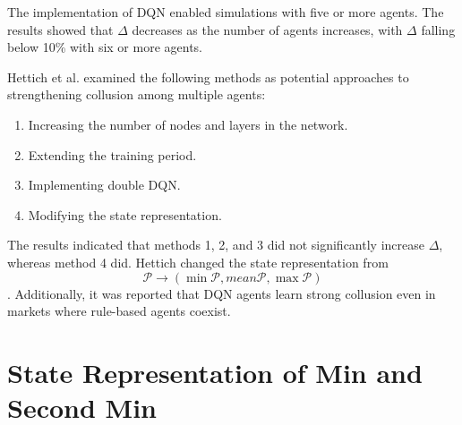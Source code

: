 \documentclass[runningheads]{llncs}
\begin{document}
        The implementation of DQN enabled simulations with five or more agents.
        The results showed that $\Delta$ decreases as the number of agents increases, with $\Delta$ falling below 10\% with six or more agents.

        Hettich et al. examined the following methods as potential approaches to strengthening collusion among multiple agents:
        \begin{enumerate}
            \item Increasing the number of nodes and layers in the network.
            \item Extending the training period.
            \item Implementing double DQN.
            \item Modifying the state representation.
        \end{enumerate}

        The results indicated that methods 1, 2, and 3 did not significantly increase $\Delta$, whereas method 4 did.
        Hettich changed the state representation from \[\mathcal{P} \rightarrow  (\min{\mathcal{P}},mean{\mathcal{P}},\max{\mathcal{P}})\].
        Additionally, it was reported that DQN agents learn strong collusion even in markets where rule-based agents coexist.
\fi


\section{State Representation of Min and Second Min}
\end{document}
